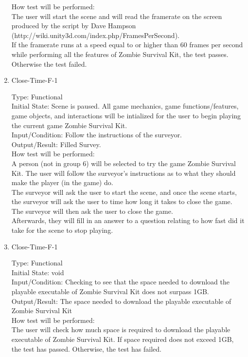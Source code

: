 \documentclass[12pt, titlepage]{article}
\begin{document}
\begin{enumerate}
	How test will be performed:\\ The user will start the scene and will read the framerate on the screen produced by the script by Dave Hampson (http://wiki.unity3d.com/index.php/FramesPerSecond). \\ 
	If the framerate runs at a speed equal to or higher than 60 frames per second while performing all the features of Zombie Survival Kit, the test passes. Otherwise the test failed.\\
	
	\item{Close-Time-F-1\\}
	
	Type: Functional \\
	
	Initial State: Scene is paused. All game mechanics, game functions/features, game objects, and interactions will be intialized for the user to begin playing the current game Zombie Survival Kit. \\
	
	Input/Condition: Follow the instructions of the surveyor. \\
	
	Output/Result: Filled Survey. \\
	
	How test will be performed:\\ A person (not in group 6) will be selected to try the game Zombie Survival Kit. The user will follow the surveyor's instructions as to what they should make the player (in the game) do. \\
	The surveyor will ask the user to start the scene, and once the scene starts, the surveyor will ask the user to time how long it takes to close the game. The surveyor will then ask the user to close the game. \\
	Afterwards, they will fill in an answer to a question relating to how fast did it take for the scene to stop playing. \\
	
	\item{Close-Time-F-1\\}
	
	Type: Functional \\
	
	Initial State: void \\
	
	Input/Condition: Checking to see that the space needed to download the playable executable of Zombie Survival Kit does not surpass 1GB. \\
	
	Output/Result: The space needed to download the playable executable of Zombie Survival Kit \\
	
	How test will be performed:\\ The user will check how much space is required to download the playable executable of Zombie Survival Kit. If space required does not exceed 1GB, the test has passed. Otherwise, the test has failed. \\
	
\end{enumerate}
\end{document}
